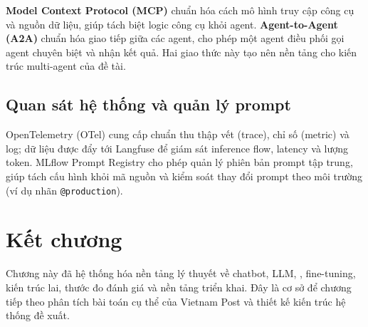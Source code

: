 \textbf{Model Context Protocol (MCP)} \cite{mcp2024} chuẩn hóa cách mô hình truy cập công cụ và nguồn dữ
liệu, giúp tách biệt logic công cụ khỏi agent. \textbf{Agent-to-Agent (A2A)} \cite{a2a2024} chuẩn hóa
giao tiếp giữa các agent, cho phép một agent điều phối gọi agent chuyên biệt và nhận
kết quả. Hai giao thức này tạo nên nền tảng cho kiến trúc multi-agent của đề tài.

\subsection{Quan sát hệ thống và quản lý prompt}

OpenTelemetry (OTel) \cite{otel2024} cung cấp chuẩn thu thập vết (trace), chỉ số (metric) và log; dữ liệu
được đẩy tới Langfuse \cite{langfuse2024} để giám sát inference flow, latency và lượng token. MLflow Prompt Registry \cite{mlflow2024} cho phép quản lý phiên bản prompt tập trung, giúp
tách cấu hình khỏi mã nguồn và kiểm soát thay đổi prompt theo môi trường (ví dụ nhãn
\texttt{@production}).

\section*{Kết chương}
Chương này đã hệ thống hóa nền tảng lý thuyết về chatbot, LLM, \rag, fine-tuning, kiến trúc
lai, thước đo đánh giá và nền tảng triển khai. Đây là cơ sở để chương tiếp theo phân tích
bài toán cụ thể của Vietnam Post và thiết kế kiến trúc hệ thống đề xuất.
